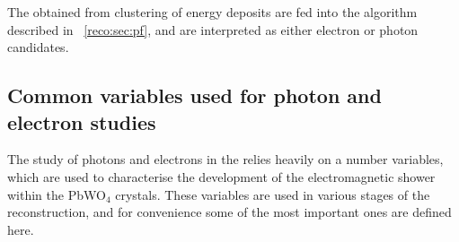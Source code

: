 The \SC\s obtained from clustering of \ECAL energy deposits are fed into the \PF algorithm described in \Sec~\ref{reco:sec:pf}, and are interpreted as either electron or photon candidates. 

\subsection{Common variables used for photon and electron studies}
\label{sec:reco:photon:showershapes}

The study of photons and electrons in the \CMS \ECAL relies heavily on a number variables, which are used to characterise the development of the electromagnetic shower within the PbWO$_4$ crystals. These variables are used in various stages of the reconstruction, and for convenience some of the most important ones are defined here. 

